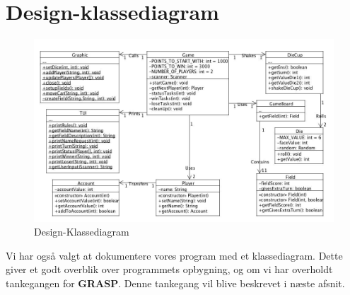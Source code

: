\section{Design-klassediagram}
\begin{figure}[ht]
\centering
\includegraphics[scale=0.4]{DesignClass.jpg}
\caption[<Text for the list of figures>]{Design-Klassediagram}
\label{fig:figure2}
\end{figure}
Vi har også valgt at dokumentere vores program med et klassediagram. Dette giver et godt overblik over programmets opbygning, og om vi har overholdt tankegangen for \textbf{GRASP}. Denne tankegang vil blive beskrevet i næste afsnit.